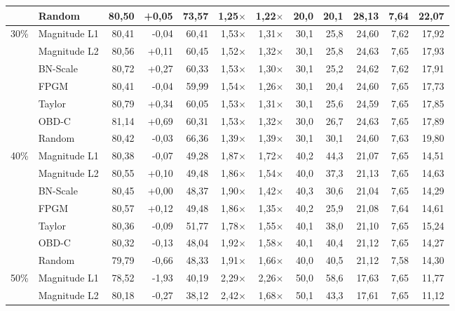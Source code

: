 \begin{table}[H]
{{\begin{tabular}{c l rr rrr rr rrr}
     & Random & 80,50 & +0,05 & 73,57 & 1,25$\times$ & 1,22$\times$ & 20,0 & 20,1 & 28,13 & 7,64 & 22,07 \\
    \midrule
    \multirow{7}{*}{30\%} & Magnitude L1 & 80,41 & -0,04 & 60,41 & 1,53$\times$ & 1,31$\times$ & 30,1 & 25,8 & 24,60 & 7,62 & 17,92 \\
     & Magnitude L2 & 80,56 & +0,11 & 60,45 & 1,52$\times$ & 1,32$\times$ & 30,1 & 25,8 & 24,63 & 7,65 & 17,93 \\
     & BN-Scale & 80,72 & +0,27 & 60,33 & 1,53$\times$ & 1,30$\times$ & 30,1 & 25,2 & 24,62 & 7,62 & 17,91 \\
     & FPGM & 80,41 & -0,04 & 59,99 & 1,54$\times$ & 1,26$\times$ & 30,1 & 20,4 & 24,60 & 7,65 & 17,73 \\
     & Taylor & 80,79 & +0,34 & 60,05 & 1,53$\times$ & 1,31$\times$ & 30,1 & 25,6 & 24,59 & 7,65 & 17,85 \\
     & OBD-C & 81,14 & +0,69 & 60,31 & 1,53$\times$ & 1,32$\times$ & 30,0 & 26,7 & 24,63 & 7,65 & 17,89 \\
     & Random & 80,42 & -0,03 & 66,36 & 1,39$\times$ & 1,39$\times$ & 30,1 & 30,1 & 24,60 & 7,63 & 19,80 \\
    \midrule
    \multirow{7}{*}{40\%} & Magnitude L1 & 80,38 & -0,07 & 49,28 & 1,87$\times$ & 1,72$\times$ & 40,2 & 44,3 & 21,07 & 7,65 & 14,51 \\
     & Magnitude L2 & 80,55 & +0,10 & 49,48 & 1,86$\times$ & 1,54$\times$ & 40,0 & 37,3 & 21,13 & 7,65 & 14,63 \\
     & BN-Scale & 80,45 & +0,00 & 48,37 & 1,90$\times$ & 1,42$\times$ & 40,3 & 30,6 & 21,04 & 7,65 & 14,29 \\
     & FPGM & 80,57 & +0,12 & 49,48 & 1,86$\times$ & 1,35$\times$ & 40,2 & 25,9 & 21,08 & 7,64 & 14,61 \\
     & Taylor & 80,36 & -0,09 & 51,77 & 1,78$\times$ & 1,55$\times$ & 40,1 & 38,0 & 21,10 & 7,65 & 15,24 \\
     & OBD-C & 80,32 & -0,13 & 48,04 & 1,92$\times$ & 1,58$\times$ & 40,1 & 40,4 & 21,12 & 7,65 & 14,27 \\
     & Random & 79,79 & -0,66 & 48,33 & 1,91$\times$ & 1,66$\times$ & 40,0 & 40,5 & 21,12 & 7,58 & 14,30 \\
    \midrule
    \multirow{7}{*}{50\%} & Magnitude L1 & 78,52 & -1,93 & 40,19 & 2,29$\times$ & 2,26$\times$ & 50,0 & 58,6 & 17,63 & 7,65 & 11,77 \\
     & Magnitude L2 & 80,18 & -0,27 & 38,12 & 2,42$\times$ & 1,68$\times$ & 50,1 & 43,3 & 17,61 & 7,65 & 11,12 \\

\end{tabular}}}
\end{table}

